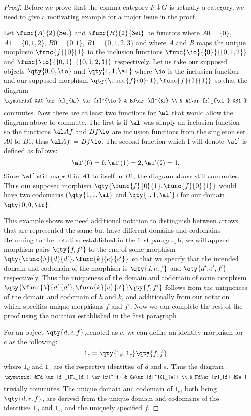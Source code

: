 \documentclass[main.tex]{subfiles}
\begin{document}
\begin{proof}
	Before we prove that the comma category $F\downarrow G$ is actually a
	category, we need to give a motivating example for a major issue in the
	proof.

	Let \(\func{A}{\mathsf{2}}{\mathsf{Set}}\) and
	\(\func{B}{\mathsf{2}}{\mathsf{Set}}\) be functors where $A0 = \{0\}$, $A1 =
	\{0,1,2\}$, $B0 = \{0,1\}$, $B1 = \{0,1,2,3\}$ and where $A$ and $B$ maps
	the unique morphism \(\func{f}{0}{1}\) to the inclusion functions
	\(\func{\io}{\{0\}}{\{0,1,2\}}\)  and \(\func{\io}{\{0,1\}}{\{0,1,2,3\}}\)
	respectively. Let us take our supposed objects $\qty{0,0,\io}$  and
	$\qty{1,1,\al}$ where $\io$ is the inclusion function and our supposed
	morphism $\qty{\func{f}{0}{1},\func{f}{0}{1}}$ so that the diagram
	\[\xymatrix{ &A0 \ar[d]_{Af} \ar[r]^{\io} & B0\ar[d]^{Bf}  \\  &
	A1\ar[r]_{\al} &B1   } \] commutes. Now there are at least two functions for
	$\al$ that would allow the diagram above to commute. The first is if $\al$
	was simply an inclusion function so the functions $\al  Af$ and $Bf
	 \io$ are inclusion functions from the singleton set $A0$ to $B1$, thus
	$\al  Af$ =  $Bf  \io$. The second function which I will denote
	$\al'$ is defined as follows:\[ \al'(0) = 0, \al'(1) = 2,\al'(2) = 1.\]
	Since $\al'$ still maps $0$ in $A1$ to itself in $B1$, the diagram above
	still commutes. Thus our supposed morphism
	$\qty{\func{f}{0}{1},\func{f}{0}{1}}$ would have two codomains
	($\qty{1,1,\al}$ and $\qty{1,1,\al'}$) for our domain $\qty{0,0,\io}$.

	This example shows we need additional notation to distinguish between arrows
	that are represented the same but have different domains and codomains.
	Returning to the notation established in the first paragraph, we will append
	morphism pairs $\qty{f,f'}$ to the end of some morphism
	$\qty{\func{h}{d}{d'},\func{k}{e}{e'}}$ so that we specify that the intended
	domain and codomain of the morphism is $\qty{d,e,f}$ and $\qty{d',e',f'}$
	respectively. Thus the uniqueness of the domain and codomain of some
	morphism $\qty{\func{h}{d}{d'},\func{k}{e}{e'}} \qty{f,f'}$ follows from the
	uniqueness of the domain and codomain of $h$ and $k$, and additionally from
	our notation which specifies unique morphisms $f$ and $f'$. Now we can
	complete the rest of the proof using the notation established in the first
	paragraph.

	For an object $\qty{d,e,f}$,denoted as $c$, we can define an identity
	morphism for $c$ as the following:  \[ 1_c  = \qty{1_{d},1_{e}}\qty{f,f}\]
	where $1_{d}$ and $1_{e}$ are the respective identities of $d$ and $e$. Thus
	the diagram \[\xymatrix{ &Fd \ar[d]_{F1_{d}} \ar[r]^{f} & Ge\ar[d]^{G1_{e}}
						 \\  & Fd\ar[r]_{f} &Ge   } \] trivially commutes. The
		unique domain and codomain of $1_c$, both being $\qty{d,e,f}$, are
		derived from the unique domain and codomains of the identities $1_d$ and
		$1_e$, and the uniquely specified $f$.


\end{proof}
\end{document}
